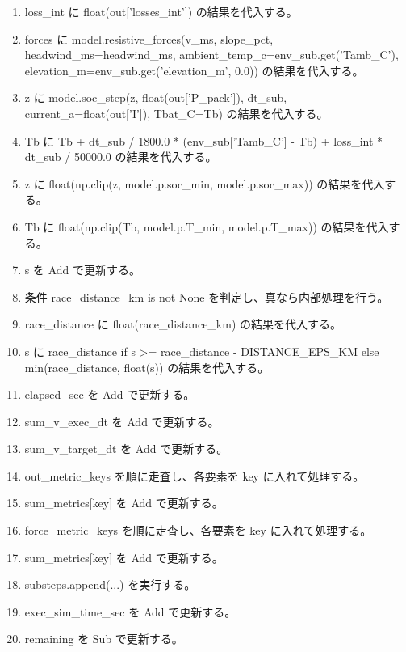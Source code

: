 \documentclass[a4paper,11pt]{article}
\begin{document}
\begin{enumerate}[leftmargin=1.8em]
\item   loss\_int に float(out['losses\_int']) の結果を代入する。
\item   forces に model.resistive\_forces(v\_ms, slope\_pct, headwind\_ms=headwind\_ms, ambient\_temp\_c=env\_sub.get('Tamb\_C'), elevation\_m=env\_sub.get('elevation\_m', 0.0)) の結果を代入する。
\item   z に model.soc\_step(z, float(out['P\_pack']), dt\_sub, current\_a=float(out['I']), Tbat\_C=Tb) の結果を代入する。
\item   Tb に Tb + dt\_sub / 1800.0 * (env\_sub['Tamb\_C'] - Tb) + loss\_int * dt\_sub / 50000.0 の結果を代入する。
\item   z に float(np.clip(z, model.p.soc\_min, model.p.soc\_max)) の結果を代入する。
\item   Tb に float(np.clip(Tb, model.p.T\_min, model.p.T\_max)) の結果を代入する。
\item   s を Add で更新する。
\item   条件 race\_distance\_km is not None を判定し、真なら内部処理を行う。
\item     race\_distance に float(race\_distance\_km) の結果を代入する。
\item     s に race\_distance if s >= race\_distance - DISTANCE\_EPS\_KM else min(race\_distance, float(s)) の結果を代入する。
\item   elapsed\_sec を Add で更新する。
\item   sum\_v\_exec\_dt を Add で更新する。
\item   sum\_v\_target\_dt を Add で更新する。
\item   out\_metric\_keys を順に走査し、各要素を key に入れて処理する。
\item     sum\_metrics[key] を Add で更新する。
\item   force\_metric\_keys を順に走査し、各要素を key に入れて処理する。
\item     sum\_metrics[key] を Add で更新する。
\item   substeps.append(...) を実行する。
\item   exec\_sim\_time\_sec を Add で更新する。
\item   remaining を Sub で更新する。
            \end{enumerate}
\end{document}
